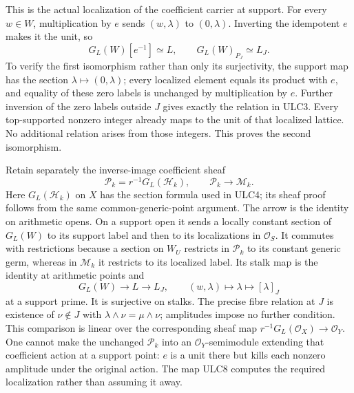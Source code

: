 This is the actual localization of the coefficient carrier at support.
For every $w\in W$, multiplication by $e$ sends $(w,\lambda)$ to
$(0,\lambda)$. Inverting the idempotent $e$ makes it the unit, so
\begin{equation}\tag{ULC6}
 G_L(W)[e^{-1}]\simeq L,
 \qquad G_L(W)_{P_J}\simeq L_J.
\end{equation}
To verify the first isomorphism rather than only its surjectivity,
the support map has the section $\lambda\mapsto(0,\lambda)$;
every localized element equals its product with $e$, and equality
of these zero labels is unchanged by multiplication by $e$.
Further inversion of the zero labels outside $J$ gives exactly
the relation in ULC3. Every top-supported nonzero integer already
maps to the unit of that localized lattice. No additional relation
arises from those integers. This proves the second isomorphism.

Retain separately the inverse-image coefficient sheaf
\begin{equation}\tag{ULC7}
 \mathcal P_k=r^{-1}G_L(\mathcal H_k),\qquad
 \mathcal P_k\longrightarrow\mathcal M_k.
\end{equation}
Here $G_L(\mathcal H_k)$ on $X$ has the section formula used in
ULC4; its sheaf proof follows from the same common-generic-point
argument. The arrow is the identity on arithmetic opens. On a support
open it sends a locally constant section of $G_L(W)$ to its support
label and then to its localizations in $\mathcal O_S$.
It commutes with restrictions because a section on $W_U$ restricts
in $\mathcal P_k$ to its constant generic germ, whereas in
$\mathcal M_k$ it restricts to its localized label. Its stalk map is
the identity at arithmetic points and
\begin{equation}\tag{ULC8}
 G_L(W)\longrightarrow L\longrightarrow L_J,
 \qquad (w,\lambda)\longmapsto\lambda\longmapsto[\lambda]_J
\end{equation}
at a support prime. It is surjective on stalks. The precise fibre
relation at $J$ is existence of $\nu\notin J$ with
$\lambda\wedge\nu=\mu\wedge\nu$; amplitudes impose no further
condition. This comparison is linear over the corresponding sheaf
map $r^{-1}G_L(\mathcal O_X)\to\mathcal O_Y$.
One cannot make the unchanged $\mathcal P_k$ into an
$\mathcal O_Y$-semimodule extending that coefficient action at a
support point: $e$ is a unit there but kills each nonzero amplitude
under the original action. The map ULC8 computes the required
localization rather than assuming it away.

